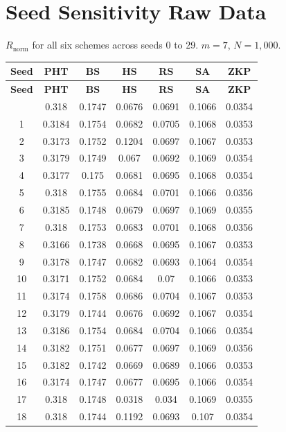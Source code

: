 \chapter{Seed Sensitivity Raw Data}
\label{app:d_seeds}

$R_{\mathrm{norm}}$ for all six schemes across seeds 0 to 29.
$m = 7$, $N = 1{,}000$.

\begin{longtable}{ccccccc}
\toprule
\textbf{Seed} &
\textbf{PHT} & \textbf{BS} & \textbf{HS} &
\textbf{RS} & \textbf{SA} & \textbf{ZKP}\\
\midrule
\endfirsthead
\toprule
\textbf{Seed} &
\textbf{PHT} & \textbf{BS} & \textbf{HS} &
\textbf{RS} & \textbf{SA} & \textbf{ZKP}\\
\midrule
\endhead
\bottomrule
\endfoot
0 & 0.318 & 0.1747 & 0.0676 & 0.0691 & 0.1066 & 0.0354 \\
1 & 0.3184 & 0.1754 & 0.0682 & 0.0705 & 0.1068 & 0.0353 \\
2 & 0.3173 & 0.1752 & 0.1204 & 0.0697 & 0.1067 & 0.0353 \\
3 & 0.3179 & 0.1749 & 0.067 & 0.0692 & 0.1069 & 0.0354 \\
4 & 0.3177 & 0.175 & 0.0681 & 0.0695 & 0.1068 & 0.0354 \\
5 & 0.318 & 0.1755 & 0.0684 & 0.0701 & 0.1066 & 0.0356 \\
6 & 0.3185 & 0.1748 & 0.0679 & 0.0697 & 0.1069 & 0.0355 \\
7 & 0.318 & 0.1753 & 0.0683 & 0.0701 & 0.1068 & 0.0356 \\
8 & 0.3166 & 0.1738 & 0.0668 & 0.0695 & 0.1067 & 0.0353 \\
9 & 0.3178 & 0.1747 & 0.0682 & 0.0693 & 0.1064 & 0.0354 \\
10 & 0.3171 & 0.1752 & 0.0684 & 0.07 & 0.1066 & 0.0353 \\
11 & 0.3174 & 0.1758 & 0.0686 & 0.0704 & 0.1067 & 0.0353 \\
12 & 0.3179 & 0.1744 & 0.0676 & 0.0692 & 0.1067 & 0.0354 \\
13 & 0.3186 & 0.1754 & 0.0684 & 0.0704 & 0.1066 & 0.0354 \\
14 & 0.3182 & 0.1751 & 0.0677 & 0.0697 & 0.1069 & 0.0356 \\
15 & 0.3182 & 0.1742 & 0.0669 & 0.0689 & 0.1066 & 0.0353 \\
16 & 0.3174 & 0.1747 & 0.0677 & 0.0695 & 0.1066 & 0.0354 \\
17 & 0.318 & 0.1748 & 0.0318 & 0.034 & 0.1069 & 0.0355 \\
18 & 0.318 & 0.1744 & 0.1192 & 0.0693 & 0.107 & 0.0354 \\

\end{longtable}

